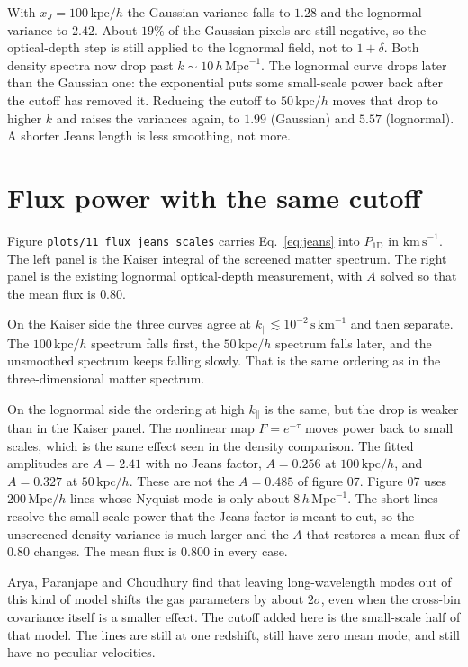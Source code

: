 \documentclass[11pt]{article}
\begin{document}
With $x_J=100\,\mathrm{kpc}/h$ the Gaussian variance falls to $1.28$ and the lognormal variance to $2.42$. About $19\%$ of the Gaussian pixels are still negative, so the optical-depth step is still applied to the lognormal field, not to $1+\delta$. Both density spectra now drop past $k\sim 10\,h\,\mathrm{Mpc}^{-1}$. The lognormal curve drops later than the Gaussian one: the exponential puts some small-scale power back after the cutoff has removed it. Reducing the cutoff to $50\,\mathrm{kpc}/h$ moves that drop to higher $k$ and raises the variances again, to $1.99$ (Gaussian) and $5.57$ (lognormal). A shorter Jeans length is less smoothing, not more.

\section{Flux power with the same cutoff}

Figure \texttt{plots/11\_flux\_jeans\_scales} carries Eq.~\eqref{eq:jeans} into $P_{1\mathrm{D}}$ in $\mathrm{km\,s}^{-1}$. The left panel is the Kaiser integral of the screened matter spectrum. The right panel is the existing lognormal optical-depth measurement, with $A$ solved so that the mean flux is $0.80$.

On the Kaiser side the three curves agree at $k_\parallel\lesssim 10^{-2}\,\mathrm{s\,km}^{-1}$ and then separate. The $100\,\mathrm{kpc}/h$ spectrum falls first, the $50\,\mathrm{kpc}/h$ spectrum falls later, and the unsmoothed spectrum keeps falling slowly. That is the same ordering as in the three-dimensional matter spectrum.

On the lognormal side the ordering at high $k_\parallel$ is the same, but the drop is weaker than in the Kaiser panel. The nonlinear map $F=e^{-\tau}$ moves power back to small scales, which is the same effect seen in the density comparison. The fitted amplitudes are $A=2.41$ with no Jeans factor, $A=0.256$ at $100\,\mathrm{kpc}/h$, and $A=0.327$ at $50\,\mathrm{kpc}/h$. These are not the $A=0.485$ of figure 07. Figure 07 uses $200\,\mathrm{Mpc}/h$ lines whose Nyquist mode is only about $8\,h\,\mathrm{Mpc}^{-1}$. The short lines resolve the small-scale power that the Jeans factor is meant to cut, so the unscreened density variance is much larger and the $A$ that restores a mean flux of $0.80$ changes. The mean flux is $0.800$ in every case.

Arya, Paranjape and Choudhury \cite{Arya:2023ipe} find that leaving long-wavelength modes out of this kind of model shifts the gas parameters by about $2\sigma$, even when the cross-bin covariance itself is a smaller effect. The cutoff added here is the small-scale half of that model. The lines are still at one redshift, still have zero mean mode, and still have no peculiar velocities.
\end{document}
